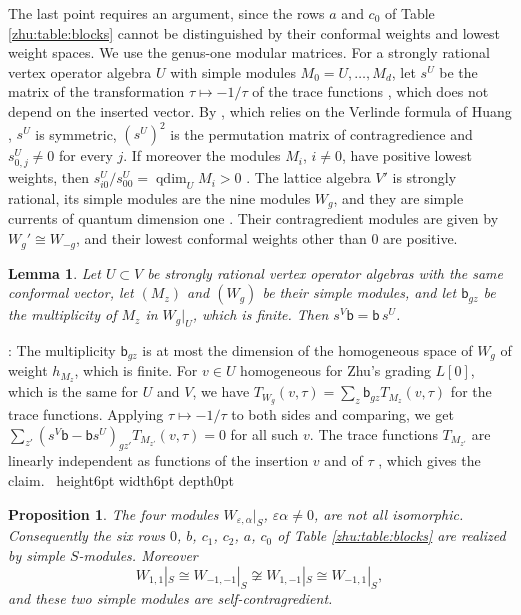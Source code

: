 \documentclass[leqno]{article}
\newcommand{\qed}{\hfill \vrule height6pt  width6pt depth0pt}
\newcommand{\epsi}{\varepsilon}
\newtheorem{prop}[thm]{Proposition}
\newtheorem{lemma}[thm]{Lemma}
\newenvironment{proof}[1][]{\noindent {\it Proof #1} : }{\hbox{~}\qed
\smallskip
}
\numberwithin{equation}{section}
\begin{document}
The last point requires an argument, since the rows $a$ and $c_0$ of Table \ref{zhu:table:blocks} cannot be distinguished by their conformal weights and lowest weight spaces. We use the genus-one modular matrices. For a strongly rational vertex operator algebra $U$ with simple modules $M_0 = U, \ldots, M_d$, let $s^U$ be the matrix of the transformation $\tau \mapsto -1/\tau$ of the trace functions \cite[Theorem 5.3.2 p.~299]{Zhu96}, which does not depend on the inserted vector. By \cite[Theorem 4.1 p.~6452]{DJX13}, which relies on the Verlinde formula of Huang \cite{Hua08b}, $s^U$ is symmetric, $(s^U)^2$ is the permutation matrix of contragredience and $s^U_{0,j} \neq 0$ for every $j$. If moreover the modules $M_i$, $i \neq 0$, have positive lowest weights, then $s^U_{i0}/s^U_{00} = \operatorname{qdim}_U M_i > 0$ \cite[Lemma 4.2 p.~6453 and its proof]{DJX13}. The lattice algebra $V'$ is strongly rational, its simple modules are the nine modules $W_g$, and they are simple currents of quantum dimension one \cite[Example 4.19 p.~6457]{DJX13}. Their contragredient modules are given by $W_g' \cong W_{-g}$, and their lowest conformal weights other than $0$ are positive.

\begin{lemma}
\label{zhu:lem:branching}
Let $U \subset V$ be strongly rational vertex operator algebras with the same conformal vector, let $(M_z)$ and $(W_g)$ be their simple modules, and let $\mathsf b_{gz}$ be the multiplicity of $M_z$ in $W_g|_U$, which is finite. Then $s^V \mathsf b = \mathsf b\, s^U$.
\end{lemma}

\begin{proof}
The multiplicity $\mathsf b_{gz}$ is at most the dimension of the homogeneous space of $W_g$ of weight $h_{M_z}$, which is finite. For $v \in U$ homogeneous for Zhu's grading $L[0]$, which is the same for $U$ and $V$, we have $T_{W_g}(v,\tau) = \sum_z \mathsf b_{gz} T_{M_z}(v,\tau)$ for the trace functions. Applying $\tau \mapsto -1/\tau$ \cite[Theorem 5.3.2 p.~299]{Zhu96} to both sides and comparing, we get $\sum_{z'} (s^V \mathsf b - \mathsf b s^U)_{g z'} T_{M_{z'}}(v,\tau) = 0$ for all such $v$. The trace functions $T_{M_{z'}}$ are linearly independent as functions of the insertion $v$ and of $\tau$ \cite[Theorem 5.3.1 p.~294 and its proof]{Zhu96}, which gives the claim.
\end{proof}

\begin{prop}
\label{zhu:prop:a-c0}
The four modules $W_{\epsi,\alpha}|_S$, $\epsi\alpha \neq 0$, are not all isomorphic. Consequently the six rows $0$, $b$, $c_1$, $c_2$, $a$, $c_0$ of Table \ref{zhu:table:blocks} are realized by simple $S$-modules. Moreover
\[
W_{1,1}|_S \cong W_{-1,-1}|_S \not\cong W_{1,-1}|_S \cong W_{-1,1}|_S,
\]
and these two simple modules are self-contragredient.
\end{prop}
\end{document}
